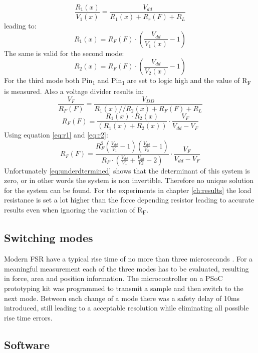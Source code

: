 \begin{equation}
    \frac{R_1(x)}{V_1(x)}=\frac{V_{dd}}{R_1(x)+R_r(F)+R_L}
    \label{eq:divider}
\end{equation}
leading to:
\begin{equation}
    R_1(x)=R_F(F)\cdot(\frac{V_{dd}}{V_1(x)}-1)
    \label{eq:r1}
\end{equation}
The same is valid for the second mode: 
\begin{equation}
    R_2(x)=R_F(F)\cdot(\frac{V_{dd}}{V_2(x)}-1)
    \label{eq:r2}
\end{equation}
For the third mode both Pin\textsubscript{1} and Pin\textsubscript{1} are set to logic high and the value of R\textsubscript{F} is measured. Also a voltage divider results in:
\begin{equation}
    \frac{V_F}{R_F(F)}=\frac{V_{DD}}{R_1(x)//R_2(x)+R_F(F)+R_L}
\end{equation}
\begin{equation}
    R_F(F)=\frac{R_1(x)\cdot R_2(x)}{(R_1(x)+R_2(x))}\cdot \frac{V_F}{V_{dd}-V_F}
    \label{eq:rf}
\end{equation}
Using equation \ref{eq:r1} and \ref{eq:r2}:
\begin{equation}
    R_F(F)=\frac{R_F^2(\frac{V_{dd}}{V_1}-1)(\frac{V_{dd}}{V_2}-1)}{R_F\cdot (\frac{V_{dd}}{V1}+\frac{V_{dd}}{V2}-2 )} \cdot \frac{V_F}{V_{dd}-V_F}
    \label{eq:underdtermined}
\end{equation}
Unfortunately \ref{eq:underdtermined} shows that the determinant of this system is zero, or in other words the system is non invertible. Therefore no unique solution for the system can be found. For the experiments in chapter \ref{ch:results} the load resistance is set a lot higher than the force depending resistor leading to accurate results even when ignoring the variation of R\textsubscript{F}.




\subsection{Switching modes}
Modern FSR have a typical rise time of no more than three microseconds  \cite{datasheet}. For a meaningful measurement each of the three modes has to be evaluated, resulting in force, area and position information. The microcontroller on a PSoC prototyping kit was programmed to transmit a sample and then switch to the next mode. Between each change of a mode there was a safety delay of 10ms introduced, still leading to a acceptable resolution while eliminating all possible rise time errors.




\subsection{Software}